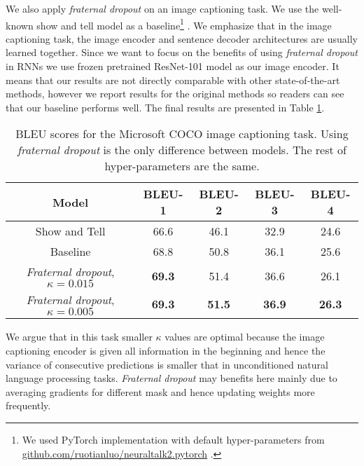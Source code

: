 \documentclass{article} %
\begin{document}
We also apply \emph{fraternal dropout} on an image captioning task. We use the well-known show and tell model as a baseline\footnote{We used PyTorch implementation with default hyper-parameters from \url{github.com/ruotianluo/neuraltalk2.pytorch} .} \citep{DBLP:journals/corr/VinyalsTBE14}. We emphasize that in the image captioning task, the image encoder and sentence decoder architectures are usually learned together. Since we want to focus on the benefits of using \emph{fraternal dropout} in RNNs we use frozen pretrained ResNet-101 \citep{DBLP:journals/corr/HeZRS15} model as our image encoder. It means that our results are not directly comparable with other state-of-the-art methods, however we report results for the original methods so readers can see that our baseline performs well. The final results are presented in Table \ref{table:MSCOCO}.

\begin{table}[t]
\vspace{-0.08cm}
\centering
\begin{tabular}{c | c c c c} 
\textbf{Model} & \textbf{BLEU-1} & \textbf{BLEU-2} & \textbf{BLEU-3} & \textbf{BLEU-4}\\
\hline
Show and Tell \cite{DBLP:journals/corr/XuBKCCSZB15} & 66.6 & 46.1 & 32.9 & 24.6\\
\hline
Baseline & 68.8 & 50.8 & 36.1 & 25.6 \\
\emph{Fraternal dropout}, $\kappa = 0.015$ & \textbf{69.3} & 51.4 & 36.6 & 26.1\\
\emph{Fraternal dropout}, $\kappa = 0.005$ & \textbf{69.3} & \textbf{51.5} & \textbf{36.9} & \textbf{26.3}\\
\end{tabular}
\caption{BLEU scores for the Microsoft COCO image captioning task. Using \emph{fraternal dropout} is the only difference between models. The rest of hyper-parameters are the same.}
\label{table:MSCOCO}
\vspace{-0.08cm}
\end{table}

We argue that in this task smaller $\kappa$ values are optimal because the image captioning encoder is given all information in the beginning and hence the variance of consecutive predictions is smaller that in unconditioned natural language processing tasks. \emph{Fraternal dropout} may benefits here mainly due to averaging gradients for different mask and hence updating weights more frequently.%
\end{document}
